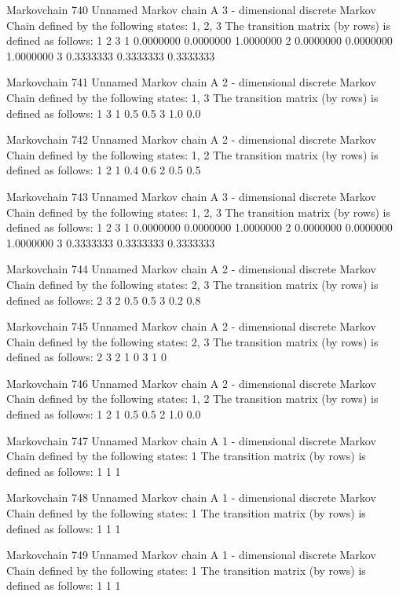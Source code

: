 \documentclass[
  nojss]{jss}
\begin{document}
\begin{CodeChunk}
\begin{CodeOutput}
Markovchain  740 
Unnamed Markov chain 
 A  3 - dimensional discrete Markov Chain defined by the following states: 
 1, 2, 3 
 The transition matrix  (by rows)  is defined as follows: 
          1         2         3
1 0.0000000 0.0000000 1.0000000
2 0.0000000 0.0000000 1.0000000
3 0.3333333 0.3333333 0.3333333

Markovchain  741 
Unnamed Markov chain 
 A  2 - dimensional discrete Markov Chain defined by the following states: 
 1, 3 
 The transition matrix  (by rows)  is defined as follows: 
    1   3
1 0.5 0.5
3 1.0 0.0

Markovchain  742 
Unnamed Markov chain 
 A  2 - dimensional discrete Markov Chain defined by the following states: 
 1, 2 
 The transition matrix  (by rows)  is defined as follows: 
    1   2
1 0.4 0.6
2 0.5 0.5

Markovchain  743 
Unnamed Markov chain 
 A  3 - dimensional discrete Markov Chain defined by the following states: 
 1, 2, 3 
 The transition matrix  (by rows)  is defined as follows: 
          1         2         3
1 0.0000000 0.0000000 1.0000000
2 0.0000000 0.0000000 1.0000000
3 0.3333333 0.3333333 0.3333333

Markovchain  744 
Unnamed Markov chain 
 A  2 - dimensional discrete Markov Chain defined by the following states: 
 2, 3 
 The transition matrix  (by rows)  is defined as follows: 
    2   3
2 0.5 0.5
3 0.2 0.8

Markovchain  745 
Unnamed Markov chain 
 A  2 - dimensional discrete Markov Chain defined by the following states: 
 2, 3 
 The transition matrix  (by rows)  is defined as follows: 
  2 3
2 1 0
3 1 0

Markovchain  746 
Unnamed Markov chain 
 A  2 - dimensional discrete Markov Chain defined by the following states: 
 1, 2 
 The transition matrix  (by rows)  is defined as follows: 
    1   2
1 0.5 0.5
2 1.0 0.0

Markovchain  747 
Unnamed Markov chain 
 A  1 - dimensional discrete Markov Chain defined by the following states: 
 1 
 The transition matrix  (by rows)  is defined as follows: 
  1
1 1

Markovchain  748 
Unnamed Markov chain 
 A  1 - dimensional discrete Markov Chain defined by the following states: 
 1 
 The transition matrix  (by rows)  is defined as follows: 
  1
1 1

Markovchain  749 
Unnamed Markov chain 
 A  1 - dimensional discrete Markov Chain defined by the following states: 
 1 
 The transition matrix  (by rows)  is defined as follows: 
  1
1 1


\end{CodeOutput}
\end{CodeChunk}
\end{document}
